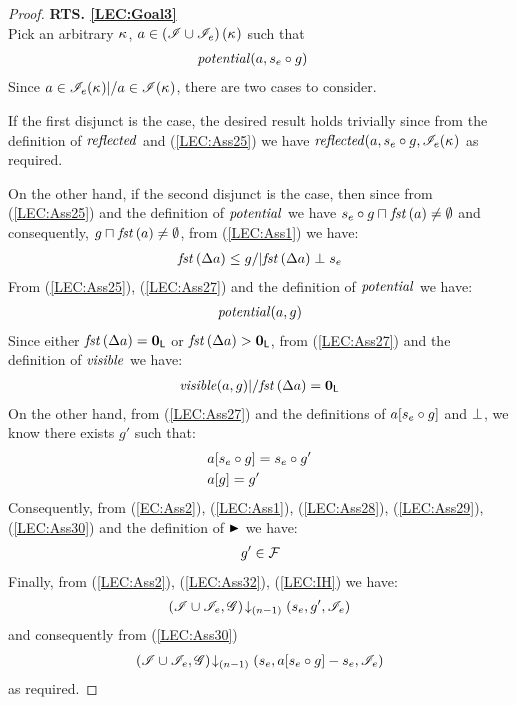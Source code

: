 \begin{lemma}
\begin{proof}
\noindent\textbf{RTS. \ref{LEC:Goal3}}\\
Pick an arbitrary $\kappa_{}$, $a \in \left(\mathscr{I} \cup \mathscr{I}_e\right)(\kappa_{})$ such that
%
\begin{align}
	& \mathit{potential}(a, s_e \circ g)  \label{LEC:Ass25}
\end{align}
Since $a \in \mathscr{I}_e(\kappa_{}) |/  a \in\mathscr{I}(\kappa_{})$, there are two cases to consider. 

If the first disjunct is the case, the desired result holds trivially since from the definition of $\mathit{reflected}$ and (\ref{LEC:Ass25}) we have $\mathit{reflected}(a, s_e \circ g, \mathscr{I}_e(\kappa_{})$ as required.

On the other hand, if the second disjunct is the case, then since from (\ref{LEC:Ass25}) and the definition of $\mathit{potential}$ we have $s_e \circ g \sqcap_{} \mathit{fst}\left(a\right) \not= \emptyset$ and consequently, $g \sqcap_{} \mathit{fst}\left(a\right) \not= \emptyset$, from (\ref{LEC:Ass1}) we have:
%
\begin{align}
	\mathit{fst}\left(\Delta {a}\right) \leq g /| \mathit{fst}\left(\Delta {a}\right) \mathrel{\bot} s_e \label{LEC:Ass27}
\end{align}
% 
From (\ref{LEC:Ass25}), (\ref{LEC:Ass27}) and the definition of $\mathit{potential}$ we have:
%
\begin{align}
	\mathit{potential}(a, g) \label{LEC:Ass28}
\end{align}
%
Since either $\mathit{fst}\left(\Delta {a}\right) = \mathbf{0}_{\textsf{L}}$ or $\mathit{fst}\left(\Delta {a}\right) > \mathbf{0}_{\textsf{L}}$, from (\ref{LEC:Ass27}) and the definition of $\mathit{visible}$ we have:
%
\begin{align}
	\mathit{visible}(a, g) |/ \mathit{fst}\left(\Delta {a}\right) = \mathbf{0}_{\textsf{L}} \label{LEC:Ass29}
\end{align}
%
On the other hand, from (\ref{LEC:Ass27}) and the definitions of $a[s_e \circ g]$ and $\mathrel{\bot}$, we know there exists $g'$ such that: 
%
\begin{align}
	& a[s_e \circ g] = s_e \circ g' \label{LEC:Ass30}\\
	& a[g] = g'  \label{LEC:Ass31}
\end{align}
%
Consequently, from (\ref{EC:Ass2}), (\ref{LEC:Ass1}), (\ref{LEC:Ass28}), (\ref{LEC:Ass29}), (\ref{LEC:Ass30}) and the definition of $\strictfences$ we have:
%
\begin{align}
	g' \in \mathcal{F}_{}  \label{LEC:Ass32}
\end{align}
%
Finally, from (\ref{LEC:Ass2}), (\ref{LEC:Ass32}), (\ref{LEC:IH}) we have:
%
\begin{align*}
	\left(\mathscr{I} \cup \mathscr{I}_{e}, \mathscr{G}\right) \!\downarrow_{(n-1)} \left(s_e, g', \mathscr{I}_e\right)
\end{align*}
%
and consequently from (\ref{LEC:Ass30})
%
\begin{align*}
	\left(\mathscr{I} \cup \mathscr{I}_{e}, \mathscr{G}\right) \!\downarrow_{(n-1)} \left(s_e, a[s_e \circ g] - s_e, \mathscr{I}_e\right)
\end{align*}
%
as required.
\end{proof}
\end{lemma}
